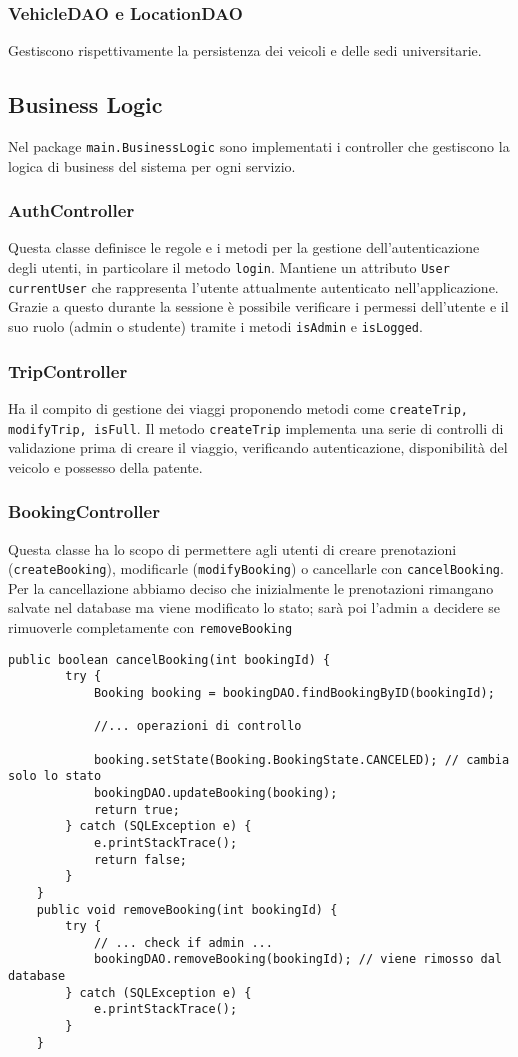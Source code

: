\subsubsection{VehicleDAO e LocationDAO}
Gestiscono rispettivamente la persistenza dei veicoli e delle sedi universitarie. 
\subsection{Business Logic}
Nel package \texttt{main.BusinessLogic} sono implementati i controller che gestiscono la logica di business del sistema per ogni servizio.
\subsubsection{AuthController}
Questa classe definisce le regole e i metodi per la gestione dell'autenticazione degli utenti, in particolare il metodo \texttt{login}. Mantiene un attributo \texttt{User currentUser} che rappresenta l'utente attualmente autenticato nell'applicazione.\\
Grazie a questo durante la sessione è possibile verificare i permessi dell'utente e il suo ruolo (admin o studente) tramite i metodi \texttt{isAdmin} e \texttt{isLogged}.
\subsubsection{TripController}
Ha il compito di gestione dei viaggi proponendo metodi come \texttt{createTrip, modifyTrip, isFull}. 
Il metodo \texttt{createTrip} implementa una serie di controlli di validazione prima di creare il viaggio, verificando autenticazione, disponibilità del veicolo e possesso della patente.
\subsubsection{BookingController}
Questa classe ha lo scopo di permettere agli utenti di creare prenotazioni (\texttt{createBooking}), modificarle (\texttt{modifyBooking}) o cancellarle con \texttt{cancelBooking}. Per la cancellazione abbiamo deciso che inizialmente le prenotazioni rimangano salvate nel database ma viene modificato lo stato; sarà poi l'admin a decidere se rimuoverle completamente con \texttt{removeBooking}
\begin{lstlisting}[style=Java, caption={Cancellazione e rimozione di una Prenotazione}]
    public boolean cancelBooking(int bookingId) {
        try {
            Booking booking = bookingDAO.findBookingByID(bookingId);
            
            //... operazioni di controllo

            booking.setState(Booking.BookingState.CANCELED); // cambia solo lo stato
            bookingDAO.updateBooking(booking); 
            return true;
        } catch (SQLException e) {
            e.printStackTrace();
            return false;
        }
    }
    public void removeBooking(int bookingId) {
        try {
            // ... check if admin ...
            bookingDAO.removeBooking(bookingId); // viene rimosso dal database
        } catch (SQLException e) {
            e.printStackTrace();
        }
    }
\end{lstlisting}
